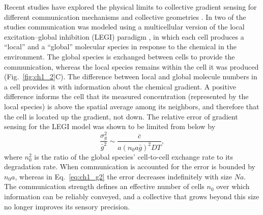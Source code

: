 Recent studies have explored the physical limits to collective gradient sensing for different communication mechanisms and collective geometries
\cite{ellison2016cell, mugler2016limits, fancher2016fundamental}.
In two of the studies \cite{ellison2016cell, mugler2016limits} communication was modeled using a multicellular version of the local excitation--global inhibition (LEGI) paradigm \cite{levchenko2002models}, in which each cell produces a ``local'' and a ``global'' molecular species in response to the chemical in the environment. The global species is exchanged between cells to provide the communication, whereas the local species remains within the cell it was produced (Fig.\ \ref{fig:ch1_2}C). The difference between local and global molecule numbers in a cell provides it with information about the chemical gradient. A positive difference informs the cell that its measured concentration (represented by the local species) is above the spatial average among its neighbors, and therefore that the cell is located up the gradient, not down.
The relative error of gradient sensing for the LEGI model was shown \cite{mugler2016limits} to be limited from below by
\begin{equation} \label{eq:ch1_g3}
    \frac{\sigma_g^2}{\bar{g}^2} \sim \frac{\bar{c}}{a(n_0a\bar{g})^2DT},
\end{equation}
where $n_0^2$ is the ratio of the global species' cell-to-cell exchange rate to its degradation rate. When communication is accounted for the error is bounded by $n_0a$, whereas in Eq.\ \ref{eq:ch1_g2} the error decreases indefinitely with size $Na$. The communication strength defines an effective number of cells $n_0$ over which information can be reliably conveyed, and a collective that grows beyond this size no longer improves its sensory precision.


